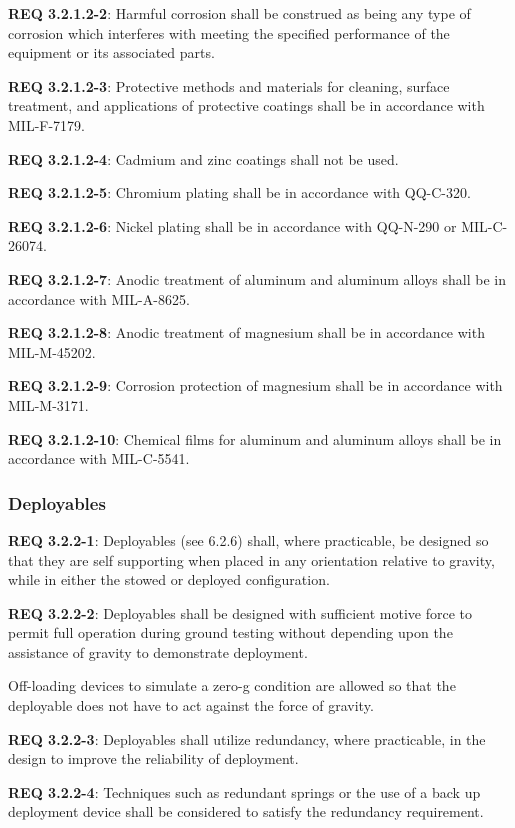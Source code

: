 \documentclass[12pt]{article}
\begin{document}
\noindent \textbf{REQ 3.2.1.2-2}: Harmful corrosion shall be construed as being any type of corrosion which interferes with meeting the specified performance of the equipment or its associated parts. 

\noindent \textbf{REQ 3.2.1.2-3}: Protective methods and materials for cleaning, surface treatment, and applications of protective coatings shall be in accordance with MIL-F-7179. 

\noindent \textbf{REQ 3.2.1.2-4}: Cadmium and zinc coatings shall not be used. 

\noindent \textbf{REQ 3.2.1.2-5}: Chromium plating shall be in accordance with QQ-C-320. 

\noindent \textbf{REQ 3.2.1.2-6}: Nickel plating shall be in accordance with QQ-N-290 or MIL-C-26074. 

\noindent \textbf{REQ 3.2.1.2-7}: Anodic treatment of aluminum and aluminum alloys shall be in accordance with MIL-A-8625. 

\noindent \textbf{REQ 3.2.1.2-8}: Anodic treatment of magnesium shall be in accordance with MIL-M-45202.

\noindent \textbf{REQ 3.2.1.2-9}: Corrosion protection of magnesium shall be in accordance with MIL-M-3171. 

\noindent \textbf{REQ 3.2.1.2-10}: Chemical films for aluminum and aluminum alloys shall be in accordance with MIL-C-5541.


\clearpage
\subsubsection{Deployables} %
\noindent \textbf{REQ 3.2.2-1}: Deployables (see 6.2.6) shall, where practicable, be designed so that they are self supporting when placed in any orientation relative to gravity, while in either the stowed or deployed configuration. 

\noindent \textbf{REQ 3.2.2-2}: Deployables shall be designed with sufficient motive force to permit full operation during ground testing without depending upon the assistance of gravity to demonstrate deployment. 

Off-loading devices to simulate a zero-g condition are allowed so that the deployable does not have to act against the force of gravity. 

\noindent \textbf{REQ 3.2.2-3}: Deployables shall utilize redundancy, where practicable, in the design to improve the reliability of deployment. 

\noindent \textbf{REQ 3.2.2-4}: Techniques such as redundant springs or the use of a back up deployment device shall be considered to satisfy the redundancy requirement. 
\end{document}
